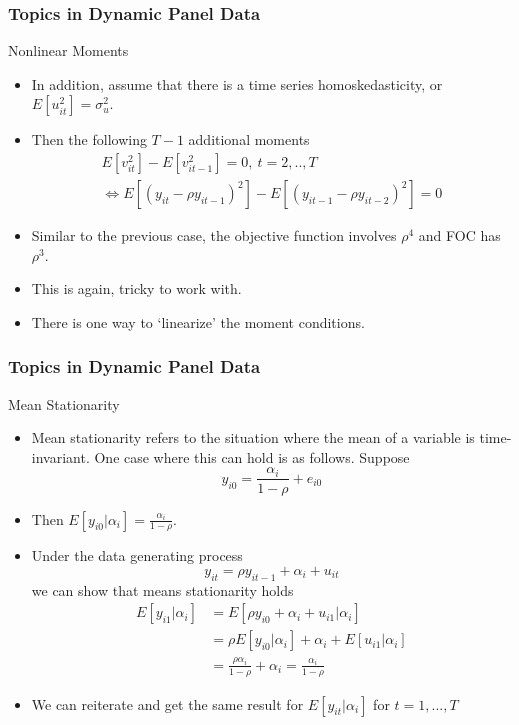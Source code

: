 \documentclass{beamer}
\begin{document}
\begin{frame}
\frametitle{Topics in Dynamic Panel Data}
Nonlinear Moments
\begin{itemize}
\item In addition, assume that there is a time series homoskedasticity, or $E[u_{it}^2]=\sigma_u^2$. 
\item Then the following $T-1$ additional moments
\begin{gather*}
E[v_{it}^2]-E[v_{it-1}^2]=0, \ t=2,..,T\\
\iff E[(y_{it}-\rho y_{it-1})^2]-E[(y_{it-1}-\rho y_{it-2})^2]=0
\end{gather*}
\item Similar to the previous case, the objective function involves $\rho^4$ and FOC has $\rho^3$. 
\item This is again, tricky to work with. 
\item There is one way to `linearize' the moment conditions. 
\end{itemize}
\end{frame}

\begin{frame}
\frametitle{Topics in Dynamic Panel Data}
Mean Stationarity
\begin{itemize}
\item Mean stationarity refers to the situation where the mean of a variable is time-invariant. One case where this can hold is as follows. Suppose
\[
y_{i0}=\frac{\alpha_i}{1-\rho}+e_{i0}
\]
\item Then $E[y_{i0}|\alpha_i]=\frac{\alpha_i}{1-\rho}$.
\item  Under the data generating process
\[
y_{it}=\rho y_{it-1}+\alpha_i +u_{it}
\]
we can show that means stationarity holds
\begin{align*}
E[y_{i1}|\alpha_i]&= E[\rho y_{i0}+\alpha_i +u_{i1}|\alpha_i]\\
&= \rho E[y_{i0}|\alpha_i]+\alpha_i + E[u_{i1}|\alpha_i]\\
&= \frac{\rho\alpha_i}{1-\rho}+\alpha_i = \frac{\alpha_i}{1-\rho}
\end{align*}
\item We can reiterate and get the same result for $E[y_{it}|\alpha_i]$ for $t=1,...,T$
\end{itemize}
\end{frame}
\end{document}

